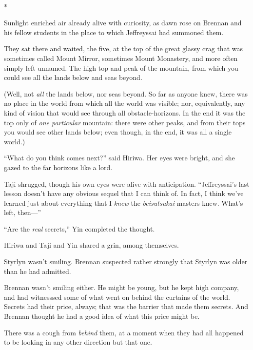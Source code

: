 {\centering
 \ ~
\par}

{\centering
 *
\par}


{
 Sunlight enriched air already alive with curiosity, as dawn rose
on Brennan and his fellow students in the place to which Jeffreyssai
had summoned them. }

{
 They sat there and waited, the five, at the top of the great
glassy crag that was sometimes called Mount Mirror, sometimes Mount
Monastery, and more often simply left unnamed. The high top and peak of
the mountain, from which you could see all the lands below and seas
beyond.}

{
 (Well, not \textit{all} the lands below, nor seas beyond. So far
as anyone knew, there was no place in the world from which all the
world was visible; nor, equivalently, any kind of vision that would see
through all obstacle-horizons. In the end it was the top only of
\textit{one particular} mountain: there were other peaks, and from
their tops you would see other lands below; even though, in the end, it
was all a single world.)}

{
 ``What do you think comes
next?'' said Hiriwa. Her eyes were bright, and she
gazed to the far horizons like a lord.}

{
 Taji shrugged, though his own eyes were alive with anticipation.
``Jeffreyssai's last lesson
doesn't have any obvious sequel that I can think of. In
fact, I think we've learned just about everything that
I \textit{knew} the \textit{beisutsukai} masters knew.
What's left, then---''}

{
 ``Are the \textit{real}
secrets,'' Yin completed the thought.}

{
 Hiriwa and Taji and Yin shared a grin, among themselves.}

{
 Styrlyn wasn't smiling. Brennan suspected rather
strongly that Styrlyn was older than he had admitted.}

{
 Brennan wasn't smiling either. He might be young,
but he kept high company, and had witnesssed some of what went on
behind the curtains of the world. Secrets had their price, always; that
was the barrier that made them secrets. And Brennan thought he had a
good idea of what this price might be.}

{
 There was a cough from \textit{behind} them, at a moment when they
had all happened to be looking in any other direction but that one.}

